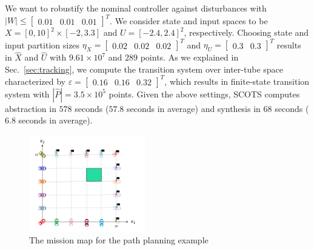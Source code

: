  We want to robustify the nominal controller against disturbances with $|W|\leq \begin{bmatrix}0.01&0.01&0.01\end{bmatrix}^T$. We consider state and input spaces to be $X=[0,10]^2\times[-2,3.3]$ and
$U=[-2.4,2.4]^2$, respectively. Choosing state and input partition sizes $\eta_{X}=\begin{bmatrix}0.02&0.02&0.02\end{bmatrix}^T$ and
$\eta_{U}=\begin{bmatrix}0.3&0.3\end{bmatrix}^T$ results in $\hat X$ and $\hat U$ with $9.61\times 10^7$ and $289$ points. As we explained in Sec.~\ref{sec:tracking}, we compute the transition system over inter-tube space characterized by $\varepsilon=\begin{bmatrix}0.16&0.16&0.32\end{bmatrix}^T$, which results in finite-state transition system with $|\hat P|=3.5\times 10^5$ points. Given the above settings, SCOTS computes abstraction in $578$ seconds ($57.8$ seconds in average) and synthesis in $68$ seconds ($6.8$ seconds in average).
\begin{figure}[t]
	\centering
	\includegraphics[width=0.45\textwidth]{figures/MA1.png}
	\caption{The mission map for the path planning example}
\end{figure}\label{fig:MA}


